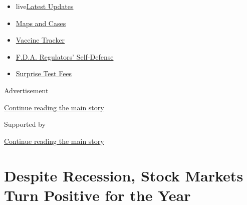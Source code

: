 \begin{itemize}
\tightlist
\item
  live\href{https://www.nytimes3xbfgragh.onion/2020/09/12/world/covid-19-coronavirus.html?name=styln-coronavirus-markets\&region=TOP_BANNER\&block=storyline_menu_recirc\&action=click\&pgtype=Article\&impression_id=ed062331-f52c-11ea-a3d9-4be88c42bbf1\&variant=undefined}{Latest
  Updates}
\item
  \href{https://www.nytimes3xbfgragh.onion/interactive/2020/us/coronavirus-us-cases.html?name=styln-coronavirus-markets\&region=TOP_BANNER\&block=storyline_menu_recirc\&action=click\&pgtype=Article\&impression_id=ed062332-f52c-11ea-a3d9-4be88c42bbf1\&variant=undefined}{Maps
  and Cases}
\item
  \href{https://www.nytimes3xbfgragh.onion/interactive/2020/science/coronavirus-vaccine-tracker.html?name=styln-coronavirus-markets\&region=TOP_BANNER\&block=storyline_menu_recirc\&action=click\&pgtype=Article\&impression_id=ed062333-f52c-11ea-a3d9-4be88c42bbf1\&variant=undefined}{Vaccine
  Tracker}
\item
  \href{https://www.nytimes3xbfgragh.onion/2020/09/10/us/politics/fda-coronavirus-vaccine.html?name=styln-coronavirus-markets\&region=TOP_BANNER\&block=storyline_menu_recirc\&action=click\&pgtype=Article\&impression_id=ed064a40-f52c-11ea-a3d9-4be88c42bbf1\&variant=undefined}{F.D.A.
  Regulators' Self-Defense}
\item
  \href{https://www.nytimes3xbfgragh.onion/2020/09/09/upshot/coronavirus-surprise-test-fees.html?name=styln-coronavirus-markets\&region=TOP_BANNER\&block=storyline_menu_recirc\&action=click\&pgtype=Article\&impression_id=ed064a41-f52c-11ea-a3d9-4be88c42bbf1\&variant=undefined}{Surprise
  Test Fees}
\end{itemize}

Advertisement

\protect\hyperlink{after-top}{Continue reading the main story}

Supported by

\protect\hyperlink{after-sponsor}{Continue reading the main story}

\hypertarget{despite-recession-stock-markets-turn-positive-for-the-year}{%
\section{Despite Recession, Stock Markets Turn Positive for the
Year}\label{despite-recession-stock-markets-turn-positive-for-the-year}}

